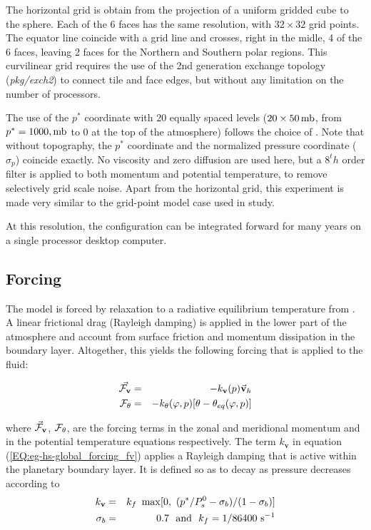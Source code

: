 The horizontal grid is obtain from the projection of a uniform gridded cube 
to the sphere. Each of the 6 faces has the same resolution, with 
$32 \times 32$ grid points. The equator line coincide with a grid line
and crosses, right in the midle, 4 of the 6 faces, leaving 2 faces 
for the Northern and Southern polar regions.
This curvilinear grid requires the use of the 2nd generation exchange
topology ({\it pkg/exch2}) to connect tile and face edges,
but without any limitation on the number of processors.

The use of the $p^*$ coordinate with 20 equally spaced levels
($20 \times 50\,{\rm mb}$, from $p^*=1000,{\rm mb}$ to $0$ at the 
top of the atmosphere) follows the choice of \cite{held-suar:94}. 
Note that without topography, the $p^*$ coordinate and the normalized 
pressure coordinate ($\sigma_p$) coincide exactly.
No viscosity and zero diffusion are used here, but
a $8^th$ order \cite{Shapiro_70} filter is applied to both momentum and
potential temperature, to remove selectively grid scale noise.
Apart from the horizontal grid, this experiment is made very similar to
the grid-point model case used in \cite{held-suar:94} study.

At this resolution, the configuration can be integrated forward 
for many years on a single processor desktop computer.
\\

\subsection{Forcing}
\label{www:tutorials}

The model is forced by relaxation to a radiative equilibrium temperature from
\cite{held-suar:94}.
A linear frictional drag (Rayleigh damping) is applied in the lower 
part of the atmosphere and account from surface friction and momentum
dissipation in the boundary layer.
Altogether, this yields the following forcing 
\cite[from][]{held-suar:94} that is applied to the fluid:

\begin{eqnarray}
\label{EQ:eg-hs-global_forcing}
\label{EQ:eg-hs-global_forcing_fv}
\vec{{\cal F}_\mathbf{v}} & = & -k_\mathbf{v}(p)\vec{\mathbf{v}}_h
\\
\label{EQ:eg-hs-global_forcing_ft}
{\cal F}_{\theta} & = & -k_{\theta}(\varphi,p)[\theta-\theta_{eq}(\varphi,p)]
\end{eqnarray}

\noindent where $\vec{\cal F}_\mathbf{v}$, ${\cal F}_{\theta}$,
are the forcing terms in the zonal and meridional
momentum and in the potential temperature equations respectively.
The term $k_\mathbf{v}$ in equation (\ref{EQ:eg-hs-global_forcing_fv}) applies a
Rayleigh damping that is active within the planetary boundary layer. 
It is defined so as to decay as pressure decreases according to
\begin{eqnarray*}
\label{EQ:eg-hs-define_kv}
k_\mathbf{v} & = & k_{f}~\max[0,~(p^*/P^{0}_{s}-\sigma_{b})/(1-\sigma_{b})]
\\
\sigma_{b} & = & 0.7 ~~{\rm and}~~
k_{f}  =  1/86400 ~{\rm s}^{-1}
\end{eqnarray*}

